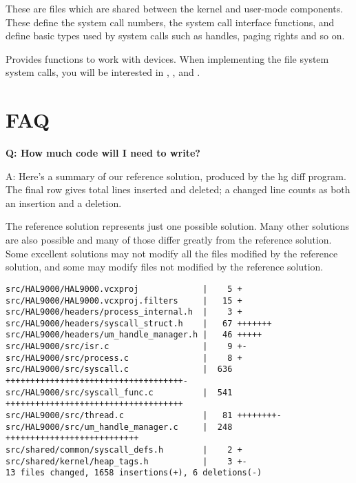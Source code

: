 


These are files which are shared between the kernel and user-mode components. These define the
system call numbers, the system call interface functions, and define basic types used by system
calls such as handles, paging rights and so on.


Provides functions to work with devices. When implementing the file system system calls, you will be
interested in , ,  and .

\section{FAQ}

\textbf{Q: How much code will I need to write?}

A: Here’s a summary of our reference solution, produced by the hg  diff program. The final row gives
total lines inserted and deleted; a changed line counts as both an insertion and a deletion.

The reference solution represents just one possible solution. Many other solutions are also possible
and many of those differ greatly from the reference solution. Some excellent solutions may not
modify all the files modified by the reference solution, and some may modify files not modified by
the reference solution.

\begin{verbatim}
src/HAL9000/HAL9000.vcxproj             |    5 +
src/HAL9000/HAL9000.vcxproj.filters     |   15 +
src/HAL9000/headers/process_internal.h  |    3 +
src/HAL9000/headers/syscall_struct.h    |   67 +++++++
src/HAL9000/headers/um_handle_manager.h |   46 +++++
src/HAL9000/src/isr.c                   |    9 +-
src/HAL9000/src/process.c               |    8 +
src/HAL9000/src/syscall.c               |  636 ++++++++++++++++++++++++++++++++++++-
src/HAL9000/src/syscall_func.c          |  541 ++++++++++++++++++++++++++++++++++++
src/HAL9000/src/thread.c                |   81 ++++++++-
src/HAL9000/src/um_handle_manager.c     |  248 +++++++++++++++++++++++++++
src/shared/common/syscall_defs.h        |    2 +
src/shared/kernel/heap_tags.h           |    3 +-
13 files changed, 1658 insertions(+), 6 deletions(-)
\end{verbatim}

